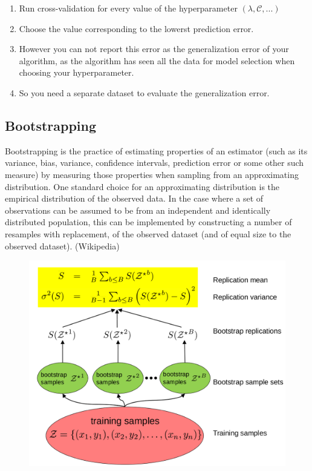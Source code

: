 \documentclass[MachineLearning]{subfiles}
\begin{document}
\begin{enumerate}
\item Run cross-­validation for every value of the hyperparameter \((\lambda,\mathcal{C},...)\)
\item Choose the value corresponding to the lowerst prediction error.
\item However you can not report this error as the generalization error of your algorithm, as the algorithm has seen all the data for model selection when choosing your hyperparameter.
\item So you need a separate dataset to evaluate the generalization error.
\end{enumerate}


\subsection{Bootstrapping}
Bootstrapping is the practice of estimating properties of an estimator (such as its variance, bias, variance, confidence intervals, prediction error or some other such measure) by measuring those properties when sampling from an approximating distribution. One standard choice for an approximating distribution is the empirical distribution of the observed data. In the case where a set of observations can be assumed to be from an independent and identically distributed population, this can be implemented by constructing a number of resamples with replacement, of the observed dataset (and of equal size to the observed dataset). (Wikipedia)

\begin{figure}[H]
\centering
\includegraphics[width=0.8\linewidth]{figs/bootstrapping-process}
\end{figure}
\end{document}
